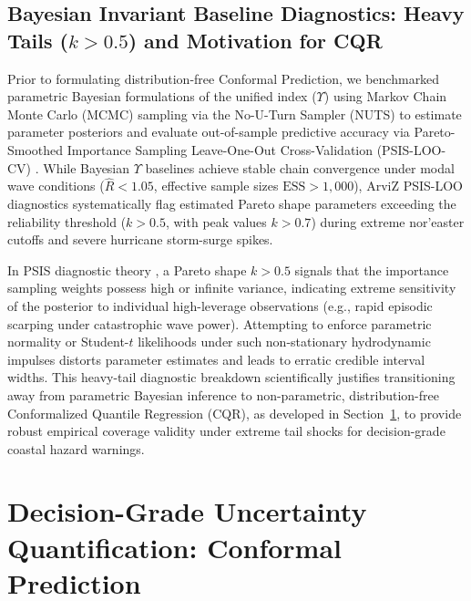 \documentclass[journal]{IEEEtran}
\begin{document}
\subsection{Bayesian Invariant Baseline Diagnostics: Heavy Tails \texorpdfstring{($k > 0.5$)}{(k > 0.5)} and Motivation for CQR}
\label{sec:bayesian_loo_breakdown}
Prior to formulating distribution-free Conformal Prediction, we benchmarked parametric Bayesian formulations of the unified index ($\Upsilon$) using Markov Chain Monte Carlo (MCMC) sampling via the No-U-Turn Sampler (NUTS) to estimate parameter posteriors and evaluate out-of-sample predictive accuracy via Pareto-Smoothed Importance Sampling Leave-One-Out Cross-Validation (PSIS-LOO-CV) \cite{vehtari2017practical}. While Bayesian $\Upsilon$ baselines achieve stable chain convergence under modal wave conditions ($\hat{R} < 1.05$, effective sample sizes $\text{ESS} > 1{,}000$), ArviZ PSIS-LOO diagnostics systematically flag estimated Pareto shape parameters exceeding the reliability threshold ($k > 0.5$, with peak values $k > 0.7$) during extreme nor'easter cutoffs and severe hurricane storm-surge spikes.

In PSIS diagnostic theory \cite{vehtari2017practical}, a Pareto shape $k > 0.5$ signals that the importance sampling weights possess high or infinite variance, indicating extreme sensitivity of the posterior to individual high-leverage observations (e.g., rapid episodic scarping under catastrophic wave power). Attempting to enforce parametric normality or Student-$t$ likelihoods under such non-stationary hydrodynamic impulses distorts parameter estimates and leads to erratic credible interval widths. This heavy-tail diagnostic breakdown scientifically justifies transitioning away from parametric Bayesian inference to non-parametric, distribution-free Conformalized Quantile Regression (CQR), as developed in Section~\ref{sec:conformal_uq}, to provide robust empirical coverage validity under extreme tail shocks for decision-grade coastal hazard warnings.

\section{Decision-Grade Uncertainty Quantification: Conformal Prediction}
\label{sec:conformal_uq}
\end{document}

